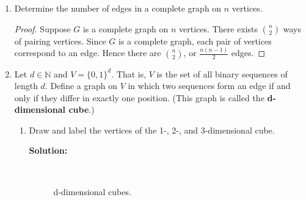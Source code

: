 \documentclass[12pt]{article}
\renewcommand{\emph}[1]{\textsf{\textbf{#1}}}
\newcommand\solution{\localhead{Solution:}}
\newcommand{\localhead}[1]{\par\smallskip\textbf{#1}\nobreak\\}%
\newcommand{\bbN}{\mathbb{N}}
\begin{document}
\begin{enumerate}

	\item Determine the number of edges in a complete graph on $n$ vertices.
	\begin{proof} 
		Suppose $G$ is a complete graph on $n$ vertices. There exists $n \choose 2$ ways of pairing vertices. Since $G$ is a complete graph, each pair of vertices correspond to an edge. Hence there are $n \choose 2$, or $\frac{n(n - 1)}{2}$ edges. 
	\end{proof}
	\vspace{.5in}


	\item Let $d \in \bbN$ and $V=\{0,1\}^d.$ That is, $V$ is the set of all binary sequences of length $d.$ Define a graph on $V$ in which two sequences form an edge if and only if they differ in exactly one position. (This graph is called the \emph{d-dimensional cube}.) 
		\begin{enumerate}
			\item Draw and label the vertices of the 1-, 2-, and 3-dimensional cube.\\
				\solution

					\begin{figure}[H]
					    \centering
					    \qquad
					    \\
						\caption{d-dimensional cubes.}
					    \label{fig:-cubes}%
					\end{figure}





\end{enumerate}
\end{enumerate}
\end{document}
